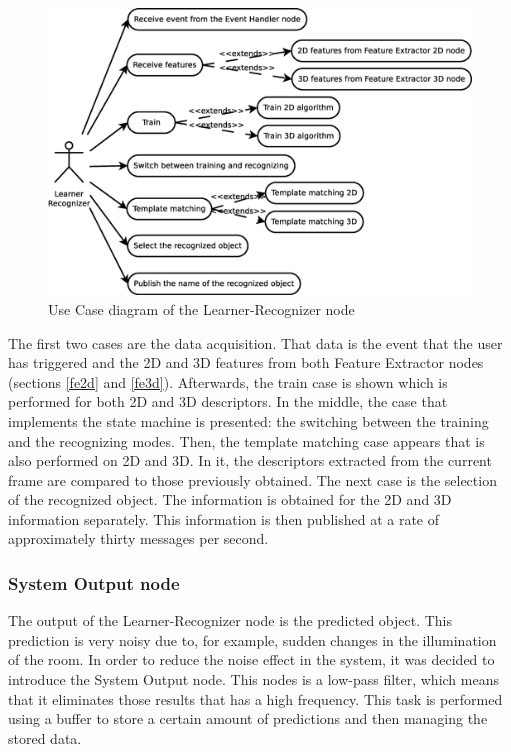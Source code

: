 	\begin{figure}[H]
		\centering
			\includegraphics[scale=0.4]{img/diagrams/uc_learner_recognizer.eps}
			\caption[Use case diagram Learner-Recognizer node]{Use Case diagram of the Learner-Recognizer node}
			\label{uc_learner_recognizer}
	\end{figure}

	The first two cases are the data acquisition. 
	That data is the event that the user has triggered and the 2D and 3D features from both Feature Extractor nodes (sections \ref{fe2d} and \ref{fe3d}).
	Afterwards, the train case is shown which is performed for both 2D and 3D descriptors.
	In the middle, the case that implements the state machine is presented: the switching between the training and the recognizing modes. 
	Then, the template matching case appears that is also performed on 2D and 3D. 
	In it, the descriptors extracted from the current frame are compared to those previously obtained.
	The next case is the selection of the recognized object. 
	The information is obtained for the 2D and 3D information separately. 
	This information is then published at a rate of approximately thirty messages per second. 



\subsubsection{System Output node}
\label{last_node}
	The output of the Learner-Recognizer node is the predicted object. 
	This prediction is very noisy due to, for example, sudden changes in the illumination of the room. 
	In order to reduce the noise effect in the system, it was decided to introduce the System Output node. 
	This nodes is a low-pass filter, which means that it eliminates those results that has a high frequency. 
	This task is performed using a buffer to store a certain amount of predictions and then managing the stored data. 
	\\

